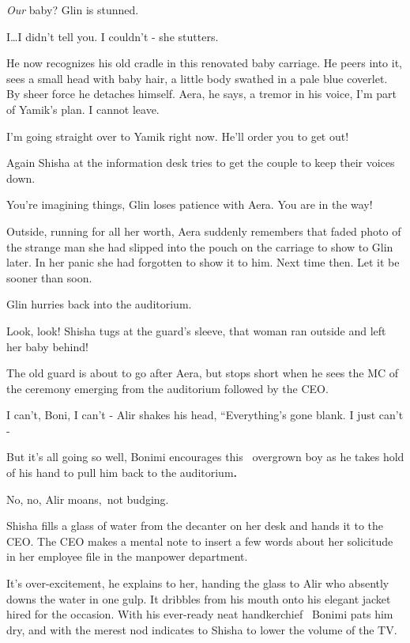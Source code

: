 \documentclass[12pt]{book}
\begin{document}
{\textquotedbl}\textit{Our }baby?{\textquotedbl} Glin is stunned.

{\textquotedbl}I{\dots}I didn't tell you. I couldn't - {\textquotedbl}she stutters.

He now recognizes his old cradle in this renovated baby carriage. He peers into it,{ }sees a small head
with baby hair, a little{ }body swathed in a pale blue coverlet. By sheer force
he detaches himself. {\textquotedbl}Aera,{\textquotedbl} he says, a tremor in his voice, {\textquotedbl}I'm part of
Yamik's plan. I cannot leave.{\textquotedbl}

{\textquotedbl}I'm going straight over to Yamik right now. He'll order you to get out!{\textquotedbl}

Again Shisha at the information desk tries to get the couple to keep their voices down.

{\textquotedbl}You're imagining things,{\textquotedbl} Glin loses patience with Aera. {\textquotedbl}You are in the
way!{\textquotedbl}

Outside, running for all her worth, Aera suddenly remembers that faded photo of the strange man she had slipped into the
pouch on the carriage to show to Glin later. In her panic she had forgotten to show it to him. Next time then. Let it
be sooner than soon.

Glin hurries back into the auditorium.

{\textquotedbl}Look, look!{\textquotedbl} Shisha tugs at the guard's sleeve,{\textquotedbl} that woman ran outside and
left her baby behind!{\textquotedbl}

The old guard is about to go after Aera, but stops short when he sees the MC of the ceremony emerging from the
auditorium followed by the CEO.

{\textquotedbl}I can't, Boni, I can't -{\textquotedbl} Alir shakes his head, ``Everything's gone blank. I just can't
-{\textquotedbl}~

{\textquotedbl}But it's all going so well,{\textquotedbl} Bonimi encourages this {\ }overgrown boy as he
takes hold of his hand to pull him back to the auditorium\textbf{. }

{\textquotedbl}No, no,{\textquotedbl} Alir moans,~not budging.

Shisha fills a glass of water from the decanter on her desk and hands it to the CEO. The CEO makes a mental note to
insert a few words about her solicitude in her employee file in the manpower department.

{\textquotedbl}It's over-excitement,{\textquotedbl} he explains to her, handing the glass to Alir who absently downs the
water in one gulp. It dribbles from his mouth onto his elegant jacket hired for the occasion. With his ever-ready neat
handkerchief \ Bonimi pats him dry, and with the merest nod indicates to Shisha to lower the volume of the TV.
\end{document}
